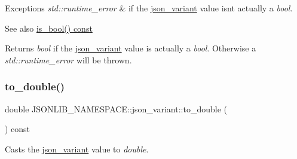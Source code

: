 \begin{DoxyExceptions}{Exceptions}
{\em std\+::runtime\+\_\+error} & if the \hyperlink{classJSONLIB__NAMESPACE_1_1json__variant}{json\+\_\+variant} value isn\textquotesingle{}t actually a {\itshape bool}. \\
\hline
\end{DoxyExceptions}
\begin{DoxySeeAlso}{See also}
\hyperlink{classJSONLIB__NAMESPACE_1_1json__variant_a99bd3f5d21800b7b1cc7af956c17d534}{is\+\_\+bool() const} 
\end{DoxySeeAlso}
\begin{DoxyReturn}{Returns}
{\itshape bool} if the \hyperlink{classJSONLIB__NAMESPACE_1_1json__variant}{json\+\_\+variant} value is actually a {\itshape bool}. Otherwise a {\itshape std\+::runtime\+\_\+error} will be thrown. 
\end{DoxyReturn}
\mbox{\label{classJSONLIB__NAMESPACE_1_1json__variant_a9a5c7a9568e052b4a38d1b6107038d7b}} 
\subsubsection{\texorpdfstring{to\+\_\+double()}{to\_double()}\hspace{0.1cm}{\footnotesize\ttfamily [1/2]}}
{\footnotesize\ttfamily double J\+S\+O\+N\+L\+I\+B\+\_\+\+N\+A\+M\+E\+S\+P\+A\+C\+E\+::json\+\_\+variant\+::to\+\_\+double (\begin{DoxyParamCaption}{ }\end{DoxyParamCaption}) const}



Casts the \hyperlink{classJSONLIB__NAMESPACE_1_1json__variant}{json\+\_\+variant} value to {\itshape double}. 


